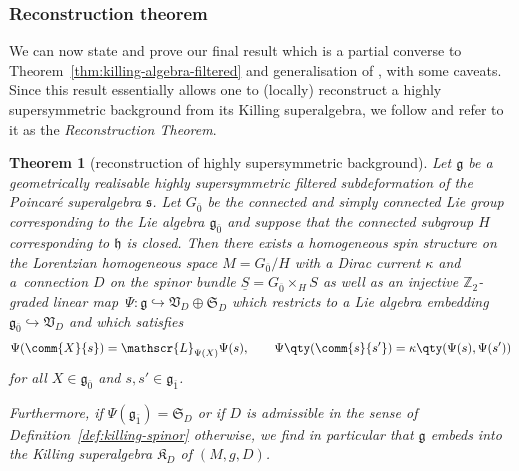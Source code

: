 \documentclass[10pt,a4paper]{amsart}
\numberwithin{equation}{section}
\newtheorem{Theorem}{Theorem}[section]
\newcommand{\fg}{\mathfrak{g}}
\newcommand{\fh}{\mathfrak{h}}
\newcommand{\fs}{\mathfrak{s}}
\newcommand{\fK}{\mathfrak{K}}
\newcommand{\fS}{\mathfrak{S}}
\newcommand{\fV}{\mathfrak{V}}
\newcommand{\ZZ}{\mathbb{Z}}
\newcommand{\eL}{\mathscr{L}}
\newcommand{\Sbundle}{\underline{S}}
\newcommand{\1}{\mathbbm{1}}
\begin{document}
\subsubsection{Reconstruction theorem}

We can now state and prove our final result which is a partial converse to Theorem~\ref{thm:killing-algebra-filtered} and generalisation of \cite[Theorem~13]{Figueroa-OFarrill2017_1}, with some caveats. Since this result essentially allows one to (locally) reconstruct a highly supersymmetric background from its Killing superalgebra, we follow \cite{Figueroa-OFarrill2017_1,Santi2022} and refer to it as the \emph{Reconstruction Theorem}.

\begin{Theorem}[reconstruction of highly supersymmetric background]\label{thm:homog-spin-mfld}	
	Let $\fg$ be a geometrically realisable highly supersymmetric filtered subdeformation of the Poincar\'e superalgebra $\fs$.
	Let $G_{\overline0}$ be the connected and simply connected Lie group corresponding to the Lie algebra $\fg_{\overline0}$ and suppose that the connected subgroup $H$ corresponding to $\fh$ is closed.
	Then there exists a homogeneous spin structure on the Lorentzian homogeneous space $M=G_{\overline0}/H$ with a Dirac current $\kappa$ and a~connection $D$ on the spinor bundle $\Sbundle=G_{\overline 0}\times_H S$ as well as an injective $\ZZ_2$-graded linear map~${\Psi\colon\fg\hookrightarrow\fV_D\oplus\fS_D}$ which restricts to a Lie algebra embedding $\fg_{\overline 0}\hookrightarrow\fV_D$ and which satisfies
	\begin{align}\label{eq:reconstruct-brackets}
		\Psi(\comm{X}{s}) = \eL_{\Psi(X)}\Psi(s),
		\qquad \Psi\qty(\comm{s}{s'}) = \kappa\qty(\Psi(s),\Psi(s'))
	\end{align}
	for all $X\in\fg_{\overline 0}$ and $s,s'\in \fg_{\overline 1}$.
	
	Furthermore, if $\Psi(\fg_{\overline 1})=\fS_D$ or if $D$ is admissible in the sense of Definition~{\rm\ref{def:killing-spinor}} otherwise, we find in particular that $\fg$ embeds into the Killing superalgebra $\fK_D$ of $(M,g,D)$.
\end{Theorem}
\end{document}
